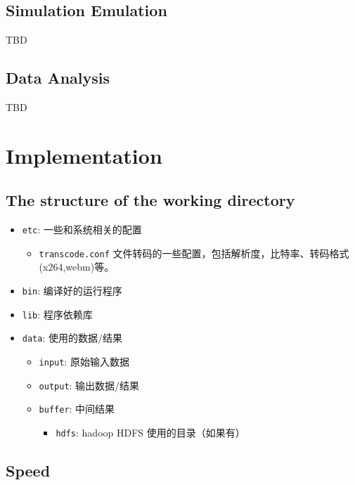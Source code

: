 \subsection{Simulation Emulation}
TBD

\subsection{Data Analysis}
TBD











\section{Implementation}

\subsection{The structure of the working directory}

\begin{itemize}
  \item \texttt{etc}: 一些和系统相关的配置
    \begin{itemize}
      \item \texttt{transcode.conf} 文件转码的一些配置，包括解析度，比特率、转码格式(x264,webm)等。
    \end{itemize}
  \item \texttt{bin}: 编译好的运行程序
  \item \texttt{lib}: 程序依赖库
  \item \texttt{data}: 使用的数据/结果
    \begin{itemize}
      \item \texttt{input}: 原始输入数据
      \item \texttt{output}: 输出数据/结果
      \item \texttt{buffer}: 中间结果
        \begin{itemize}
          \item \texttt{hdfs}: hadoop HDFS 使用的目录（如果有）
        \end{itemize}
  \end{itemize}
\end{itemize}


\subsection{Speed}


